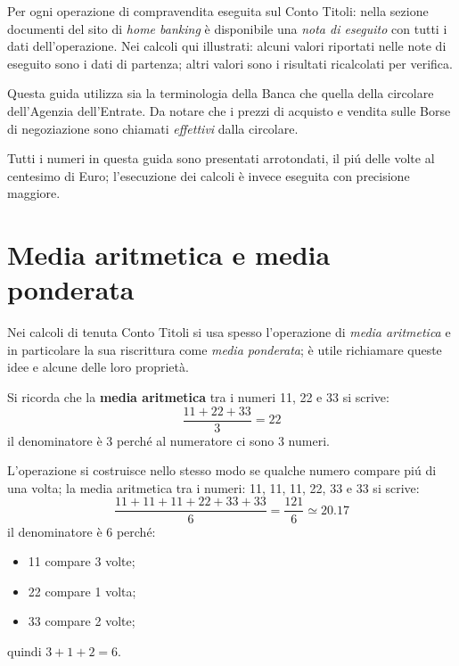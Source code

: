 \documentclass[12pt,a4paper]{article}
\begin{document}
Per  ogni  operazione di  compravendita  eseguita  sul  Conto Titoli:  nella  sezione
documenti del sito  di \emph{home banking} è disponibile una  \emph{nota di eseguito}
con  tutti  i  dati  dell'operazione.   Nei calcoli  qui  illustrati:  alcuni  valori
riportati  nelle note  di eseguito  sono  i dati  di  partenza; altri  valori sono  i
risultati ricalcolati per verifica.

Questa guida  utilizza sia  la terminologia  della Banca  che quella  della circolare
dell'Agenzia dell'Entrate.  Da notare che i  prezzi di acquisto e vendita sulle Borse
di negoziazione sono chiamati \emph{effettivi} dalla circolare.

Tutti i  numeri in questa  guida sono presentati arrotondati,  il piú delle  volte al
centesimo  di  Euro;  l'esecuzione  dei  calcoli è  invece  eseguita  con  precisione
maggiore.

\section{Media aritmetica e media ponderata}


Nei  calcoli  di tenuta  Conto  Titoli  si  usa  spesso l'operazione  di  \emph{media
   aritmetica} e  in particolare  la sua riscrittura  come \emph{media  ponderata}; è
utile richiamare queste idee e alcune delle loro proprietà.

Si  ricorda che  la  \textbf{media  aritmetica} tra  i  numeri  \num{11}, \num{22}  e
\num{33} si scrive:
\begin{equation*}
  \frac{\num{11} + \num{22} + \num{33}}{3} = \num{22}
\end{equation*}
il denominatore è \num{3} perché al numeratore ci sono \num{3} numeri.

L'operazione si  costruisce nello stesso  modo se qualche  numero compare piú  di una
volta;  la media  aritmetica tra  i numeri:  \num{11}, \num{11},  \num{11}, \num{22},
\num{33} e \num{33} si scrive:
\begin{equation*}
  \frac{\num{11} + \num{11} + \num{11} + \num{22} + \num{33} + \num{33}}{6}
  = \frac{121}{6} \simeq \num{20,17}
\end{equation*}
il denominatore è \num{6} perché:
\begin{itemize}
\item \num{11} compare \num{3} volte;
\item \num{22} compare \num{1} volta;
\item \num{33} compare \num{2} volte;
\end{itemize}
quindi \(\num{3} + \num{1} + \num{2} = \num{6}\).
\end{document}
